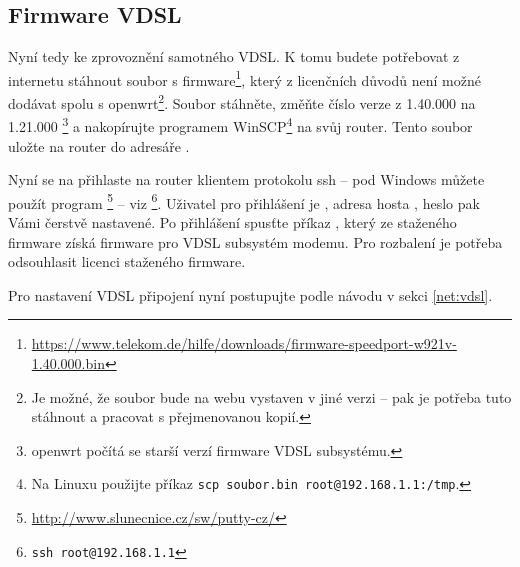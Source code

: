 \subsection{Firmware VDSL}
\label{firstboot:vdslfw}
Nyní tedy ke zprovoznění samotného VDSL.
K tomu budete
potřebovat z internetu stáhnout soubor s firmware\footnote{
\url{https://www.telekom.de/hilfe/downloads/firmware-speedport-w921v-1.40.000.bin}},
který z licenčních důvodů není možné dodávat spolu s \gls{openwrt}\footnote{
Je možné, že soubor bude na webu vystaven v jiné verzi -- pak je potřeba tuto
stáhnout a pracovat s přejmenovanou kopií.
}. Soubor stáhněte, změňte číslo verze z 1.40.000 na 1.21.000 \footnote{\gls{openwrt}
\wrtversion počítá se starší verzí firmware VDSL subsystému.}
a nakopírujte programem WinSCP\footnote{Na Linuxu použijte příkaz
{\texttt{scp soubor.bin root@192.168.1.1:/tmp}}.} na svůj router.
Tento soubor uložte na router do adresáře .

Nyní se na přihlaste na router klientem protokolu \gls{ssh} -- pod Windows můžete
použít program \footnote{\url{http://www.slunecnice.cz/sw/putty-cz/}} -- viz \footnote{\texttt{ssh root@192.168.1.1}}.
Uživatel pro přihlášení
je , adresa hosta , heslo pak Vámi čerstvě nastavené.
Po přihlášení spusťte příkaz , který ze staženého firmware
získá firmware pro VDSL subsystém modemu. Pro rozbalení je potřeba odsouhlasit
licenci staženého firmware.

Pro nastavení VDSL připojení nyní postupujte podle návodu v sekci \ref{net:vdsl}.
